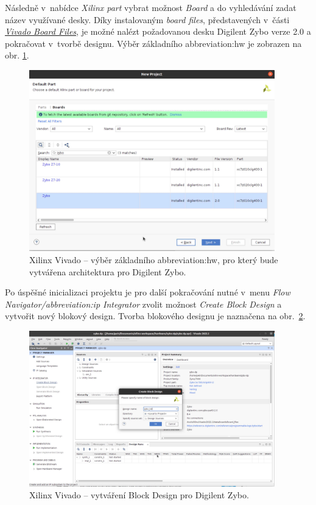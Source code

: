 \documentclass[a4paper, twoside, 11pt]{article}
\begin{document}
\begin{appendices}
		Následně v~nabídce \textit{Xilinx part} vybrat možnost \textit{Board} a do vyhledávání zadat název využívané desky. Díky instalovaným \textit{board files}, představených v~části \hyperref[subsec:vivado-board-files]{\textit{Vivado Board Files}}, je možné nalézt požadovanou desku Digilent Zybo verze 2.0 a pokračovat v~tvorbě designu. Výběr základního \gls{abbreviation:hw} je zobrazen na obr. \ref{fig:zybo-xilinx-vivado-flow-02}.

		\begin{figure}[htbp!]
			\centering
			\includegraphics[width=0.95\textwidth]{src/png/zybo-xilinx-vivado-flow/zybo-xilinx-vivado-flow-02.jpg}
			\caption{Xilinx Vivado – výběr základního \gls{abbreviation:hw}, pro který bude vytvářena architektura pro Digilent Zybo.}
			\label{fig:zybo-xilinx-vivado-flow-02}
		\end{figure}
		
		Po úspěšné inicializaci projektu je pro další pokračování nutné v~menu \textit{Flow Navigator/\gls{abbreviation:ip} Integrator} zvolit možnost \textit{Create Block Design} a vytvořit nový blokový design. Tvorba blokového designu je naznačena na obr.~\ref{fig:zybo-xilinx-vivado-flow-05}.
		
		\begin{figure}[htbp!]
			\centering
			\includegraphics[width=0.95\textwidth]{src/png/zybo-xilinx-vivado-flow/zybo-xilinx-vivado-flow-05.jpg}
			\caption{Xilinx Vivado – vytváření Block Design pro Digilent Zybo.}
			\label{fig:zybo-xilinx-vivado-flow-05}
		\end{figure}


\end{appendices}
\end{document}
